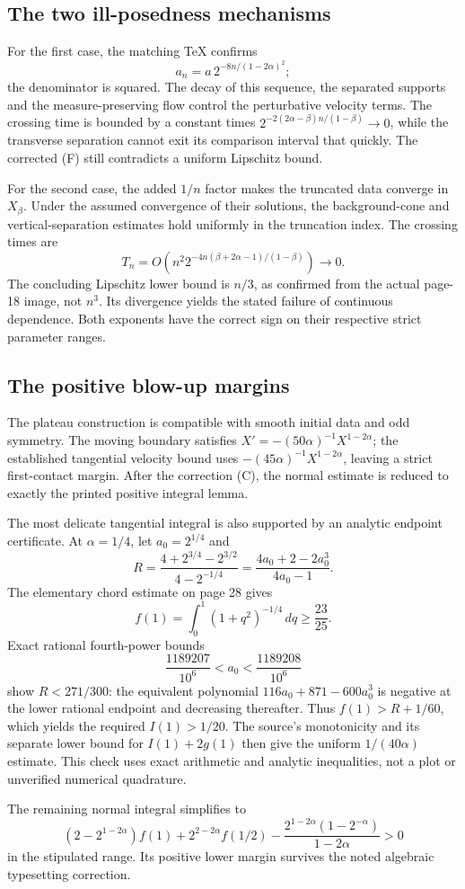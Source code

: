 \documentclass[10pt]{article}
\begin{document}
\subsection*{The two ill-posedness mechanisms}
For the first case, the matching TeX confirms \[a_n=a\,2^{-8n/(1-2\alpha)^2};\] the denominator is squared. The decay of this sequence, the separated supports and the measure-preserving flow control the perturbative velocity terms. The crossing time is bounded by a constant times \(2^{-2(2\alpha-\beta)n/(1-\beta)}\to0\), while the transverse separation cannot exit its comparison interval that quickly. The corrected (F) still contradicts a uniform Lipschitz bound.\par
For the second case, the added \(1/n\) factor makes the truncated data converge in \(X_\beta\). Under the assumed convergence of their solutions, the background-cone and vertical-separation estimates hold uniformly in the truncation index. The crossing times are \[T_n=O\!\left(n^2
       2^{-4n(\beta+2\alpha-1)/(1-\beta)}\right)\to0.\] The concluding Lipschitz lower bound is \(n/3\), as confirmed from the actual page-18 image, not \(n^3\). Its divergence yields the stated failure of continuous dependence. Both exponents have the correct sign on their respective strict parameter ranges.\par
\subsection*{The positive blow-up margins}
The plateau construction is compatible with smooth initial data and odd symmetry. The moving boundary satisfies \(X'=-(50\alpha)^{-1}X^{1-2\alpha}\); the established tangential velocity bound uses \(-(45\alpha)^{-1}X^{1-2\alpha}\), leaving a strict first-contact margin. After the correction (C), the normal estimate is reduced to exactly the printed positive integral lemma.\par
The most delicate tangential integral is also supported by an analytic endpoint certificate. At \(\alpha=1/4\), let \(a_0=2^{1/4}\) and \[R=\frac{4+2^{3/4}-2^{3/2}}{4-2^{-1/4}}
   =\frac{4a_0+2-2a_0^3}{4a_0-1}.\] The elementary chord estimate on page 28 gives \[f(1)=\int_0^1(1+q^2)^{-1/4}\,dq\ge\frac{23}{25}.\] Exact rational fourth-power bounds \[\frac{1189207}{10^6}<a_0<\frac{1189208}{10^6}\] show \(R<271/300\): the equivalent polynomial \(116a_0+871-600a_0^3\) is negative at the lower rational endpoint and decreasing thereafter. Thus \(f(1)>R+1/60\), which yields the required \(I(1)>1/20\). The source’s monotonicity and its separate lower bound for \(I(1)+2g(1)\) then give the uniform \(1/(40\alpha)\) estimate. This check uses exact arithmetic and analytic inequalities, not a plot or unverified numerical quadrature.\par
The remaining normal integral simplifies to \[(2-2^{1-2\alpha})f(1)
 +2^{2-2\alpha}f(1/2)
 -\frac{2^{1-2\alpha}(1-2^{-\alpha})}{1-2\alpha}>0\] in the stipulated range. Its positive lower margin survives the noted algebraic typesetting correction.\par
\end{document}
